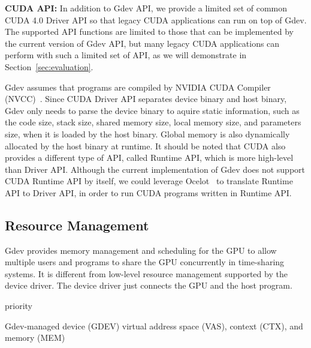\textbf{CUDA API:}
In addition to Gdev API, we provide a limited set of common
CUDA 4.0 Driver API so that legacy CUDA applications can run on top of
Gdev.
The supported API functions are limited to those that can be implemented
by the current version of Gdev API, but many legacy CUDA applications
can perform with such a limited set of API, as we will demonstrate in
Section~\ref{sec:evaluation}.

Gdev assumes that programs are compiled by NVIDIA CUDA Compiler
(NVCC)~\cite{CUDA40}.
Since CUDA Driver API separates device binary and host binary, Gdev only
needs to parse the device binary to aquire static information, such
as the code size, stack size, shared memory size, local memory size, and
parameters size, when it is loaded by the host binary.
Global memory is also dynamically allocated by the host binary at
runtime.
It should be noted that CUDA also provides a different type of API,
called Runtime API, which is more high-level than Driver API.
Although the current implementation of Gdev does not support CUDA
Runtime API by itself, we could leverage Ocelot~\cite{Diamos_PACT10} to
translate Runtime API to Driver API, in order to run CUDA programs
written in Runtime API.

\subsection{Resource Management}

Gdev provides memory management and scheduling for the GPU to allow
multiple users and programs to share the GPU concurrently in
time-sharing systems.
It is different from low-level resource management supported by the
device driver.
The device driver just connects the GPU and the host program.

priority

Gdev-managed device (GDEV) virtual address space (VAS), context (CTX),
and memory (MEM)